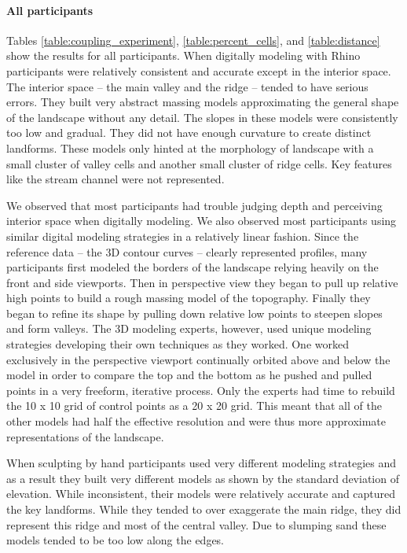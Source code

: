 \documentclass[prodmode,acmtochi]{acmsmall} %
\begin{document}

\paragraph{All participants}
Tables \ref{table:coupling_experiment},
\ref{table:percent_cells}, 
and \ref{table:distance}
show the results for all participants. 
%
When digitally modeling with Rhino
participants were relatively 
consistent and accurate except in the interior space.
The interior space -- the main valley and the ridge -- 
tended to have serious errors.
%
They built very abstract massing models 
approximating the general shape of the landscape
without any detail. 
%
The slopes in these models 
were consistently too low and gradual.
They did not have enough curvature 
to create distinct landforms. 
%
These models only hinted at 
the morphology of landscape
with a small cluster of valley cells
and another small cluster of ridge cells.  
Key features like the stream channel
were not represented. 

We observed that most participants had trouble
judging depth and perceiving interior space 
when digitally modeling. 
We also observed most participants 
using similar digital modeling strategies 
in a relatively linear fashion.
Since the reference data -- the 3D contour curves -- 
clearly represented profiles, 
many participants first modeled
the borders of the landscape
relying heavily
on the front and side viewports.
Then in perspective view 
they began to pull up relative high points 
to build a rough massing model of the topography.
Finally they began to refine its shape 
by pulling down relative low points to 
steepen slopes and form valleys.
%
The 3D modeling experts, however, 
used unique modeling strategies
developing their own techniques as they worked.
One worked exclusively in the perspective viewport
continually orbited above and below the model 
in order to compare the top and the bottom
as he pushed and pulled points
in a very freeform, iterative process. 
%
Only the experts had time to rebuild the 
10 x 10 grid of control points as a 20 x 20 grid. 
This meant that all of the other models
had half the effective resolution
and were thus more approximate
representations of the landscape. 

When sculpting by hand 
participants used very different modeling strategies 
and as a result they built very different models
as shown by the standard deviation of elevation.
While inconsistent, 
their models were relatively accurate
and captured the key landforms.
While they tended to over exaggerate the main ridge, 
they did represent
this ridge and most of the central valley.
Due to slumping sand
these models tended to be too low along the edges. 
\end{document}
